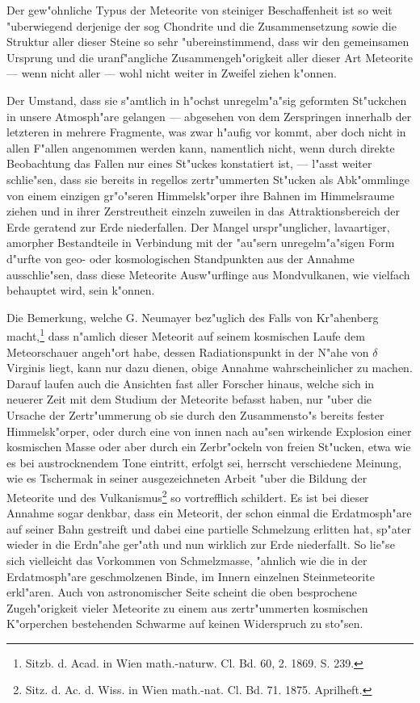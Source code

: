 \documentclass[a4paper, 11pt, oneside]{article}
\begin{document}
Der gew"ohnliche Typus der Meteorite von steiniger Beschaffenheit ist so weit "uberwiegend derjenige der sog Chondrite und die Zusammensetzung sowie die Struktur aller dieser Steine so sehr "ubereinstimmend, dass wir den gemeinsamen Ursprung und die uranf"angliche Zusammengeh"origkeit aller dieser Art Meteorite --- wenn nicht aller --- wohl nicht weiter in Zweifel ziehen k"onnen.

Der Umstand, dass sie s"amtlich in h"ochst unregelm"a"sig geformten St"uckchen in unsere Atmosph"are gelangen --- abgesehen von dem Zerspringen innerhalb der letzteren in mehrere Fragmente, was zwar h"aufig vor kommt, aber doch nicht in allen F"allen angenommen werden kann, namentlich nicht, wenn durch direkte Beobachtung das Fallen nur eines St"uckes konstatiert ist, --- l"asst weiter schlie"sen, dass sie bereits in regellos zertr"ummerten St"ucken als Abk"ommlinge von einem einzigen gr"o"seren Himmelsk"orper ihre Bahnen im Himmelsraume ziehen und in ihrer Zerstreutheit einzeln zuweilen in das Attraktionsbereich der Erde geratend zur Erde niederfallen. Der Mangel urspr"unglicher, lavaartiger, amorpher Bestandteile in Verbindung mit der "au"sern unregelm"a"sigen Form d"urfte von geo- oder kosmologischen Standpunkten aus der Annahme ausschlie"sen, dass diese Meteorite Ausw"urflinge aus Mondvulkanen, wie vielfach behauptet wird, sein k"onnen.

Die Bemerkung, welche G. Neumayer bez"uglich des Falls von Kr"ahenberg macht,\footnote{Sitzb. d. Acad. in Wien math.-naturw. Cl. Bd. 60, 2. 1869. S. 239.} dass n"amlich dieser Meteorit auf seinem kosmischen Laufe dem Meteorschauer angeh"ort habe, dessen Radiationspunkt in der N"ahe von $\delta$ Virginis liegt, kann nur dazu dienen, obige Annahme wahrscheinlicher zu machen. Darauf laufen auch die Ansichten fast aller Forscher hinaus, welche sich in neuerer Zeit mit dem Studium der Meteorite befasst haben, nur "uber die Ursache der Zertr"ummerung ob sie durch den Zusammensto"s bereits fester Himmelsk"orper, oder durch eine von innen nach au"sen wirkende Explosion einer kosmischen Masse oder aber durch ein Zerbr"ockeln von freien St"ucken, etwa wie es bei austrocknendem Tone eintritt, erfolgt sei, herrscht verschiedene Meinung, wie es Tschermak in seiner ausgezeichneten Arbeit "uber die Bildung der Meteorite und des Vulkanismus\footnote{Sitz. d. Ac. d. Wiss. in Wien math.-nat. Cl. Bd. 71. 1875. Aprilheft.} so vortrefflich schildert. Es ist bei dieser Annahme sogar denkbar, dass ein Meteorit, der schon einmal die Erdatmosph"are auf seiner Bahn gestreift und dabei eine partielle Schmelzung erlitten hat, sp"ater wieder in die Erdn"ahe ger"ath und nun wirklich zur Erde niederfallt. So lie"se sich vielleicht das Vorkommen von Schmelzmasse, "ahnlich wie die in der Erdatmosph"are geschmolzenen Binde, im Innern einzelnen Steinmeteorite erkl"aren. Auch von astronomischer Seite scheint die oben besprochene Zugeh"origkeit vieler Meteorite zu einem aus zertr"ummerten kosmischen K"orperchen bestehenden Schwarme auf keinen Widerspruch zu sto"sen.
\end{document}
